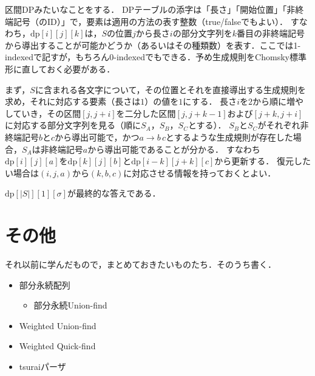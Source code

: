 \documentclass[a4paper]{jsarticle}
\begin{document}
区間DPみたいなことをする．
DPテーブルの添字は「長さ」「開始位置」「非終端記号（のID）」で，要素は適用の方法の表す整数（true/falseでもよい）．
すなわち，$\mathrm{dp}[i][j][k]$は，$S$の位置$j$から長さ$i$の部分文字列を$k$番目の非終端記号から導出することが可能かどうか（あるいはその種類数）を表す．ここでは1-indexedで記すが，もちろん0-indexedでもできる．予め生成規則をChomsky標準形に直しておく必要がある．

まず，$S$に含まれる各文字について，その位置とそれを直接導出する生成規則を求め，それに対応する要素（長さは$1$）の値を$1$にする．
長さ$i$を$2$から順に増やしていき，その区間$[j, j+i]$を二分した区間$[j, j+k-1]$および$[j+k, j+i]$に対応する部分文字列を見る（順に$S_A$，$S_B$，$S_C$とする）．
$S_B$と$S_C$がそれぞれ非終端記号$b$と$c$から導出可能で，かつ$a\to b\,c$とするような生成規則が存在した場合，$S_A$は非終端記号$a$から導出可能であることが分かる．
すなわち$\mathrm{dp}[i][j][a]$を$\mathrm{dp}[k][j][b]$と$\mathrm{dp}[i-k][j+k][c]$から更新する．
復元したい場合は$(i, j, a)$から$(k, b, c)$に対応させる情報を持っておくとよい．

$\mathrm{dp}[|S|][1][\sigma]$が最終的な答えである．

\section{その他}
それ以前に学んだもので，まとめておきたいものたち．そのうち書く．
\begin{itemize}
\item 部分永続配列
  \begin{itemize}
  \item 部分永続Union-find
  \end{itemize}
\item Weighted Union-find
\item Weighted Quick-find
\item tsuraiパーザ
\end{itemize}
\end{document}
